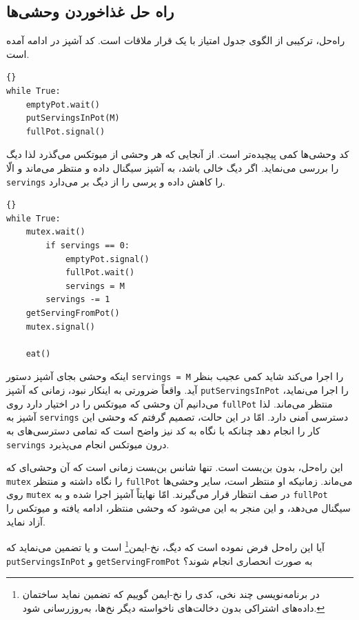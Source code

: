 \documentclass{book}
\newcommand{\clearemptydoublepage}{}%
\begin{document}
\clearemptydoublepage
\subsection{راه‌ حل غذاخوردن وحشی‌ها}

    راه‌حل،  ترکیبی از الگوی جدول امتیاز با یک قرار ملاقات است.  کد آشپز در ادامه آمده است. 

\begin{latin}
\begin{lstlisting}[title=\rl{راه‌‌حل غذاخوردن وحشی‌ها (آشپز)}]{}
while True:
    emptyPot.wait()
    putServingsInPot(M)
    fullPot.signal()
\end{lstlisting}
\end{latin}

    کد وحشی‌ها کمی پیچیده‌تر است. از آنجایی که هر وحشی از میوتکس می‌گذرد لذا دیگ را بررسی می‌نماید. 
    اگر دیگ خالی باشد، به آشپز سیگنال داده و منتظر می‌ماند و الّا  {\tt servings} را کاهش داده و پرسی را از دیگ بر می‌دارد. 

\begin{latin}
\begin{lstlisting}[title=\rl{راه‌‌حل غذاخوردن وحشی‌ها (وحشی)}]{}
while True:
    mutex.wait()
        if servings == 0:
            emptyPot.signal()
            fullPot.wait()
            servings = M
        servings -= 1
	getServingFromPot()
    mutex.signal()

    eat()
\end{lstlisting}
\end{latin}

    اینکه وحشی بجای آشپز دستور {\tt servings = M} را اجرا می‌کند شاید کمی عجیب بنظر آید. 
    واقعاً ضرورتی به اینکار نبود، زمانی که 
    آشپز {\tt putServingsInPot} را اجرا می‌نماید، می‌دانیم آن وحشی که میوتکس را در اختیار دارد 
    روی {\tt fullPot} منتظر می‌ماند. 
    لذا آشپز به  {\tt servings} دسترسی اَمنی دارد.  
    امّا در این حالت،‌ تصمیم گرفتم که وحشی این کار را انجام دهد چنانکه با نگاه به کد نیز 
    واضح است که تمامی دسترسی‌های به  {\tt servings} درون میوتکس انجام می‌پذیرد. 
    

    این راه‌حل، بدون بن‌بست است. 
    تنها شانس بن‌بست زمانی است که آن وحشی‌ای که {\tt mutex}  را نگاه داشته و منتظر {\tt fullPot} می‌ماند. 
    زمانیکه او منتظر است، سایر وحشی‌ها روی {\tt mutex} در صف انتظار قرار می‌گیرند. 
    امّا نهایتاً آشپز اجرا شده و به {\tt fullPot} سیگنال می‌دهد، 
    و این منجر به این می‌شود که  وحشی منتظر، ادامه یافته و میوتکس را آزاد نماید. 
    

    آیا این راه‌حل فرض نموده است که دیگ، نخ-ایمن\footnote{%
    در برنامه‌نویسی چند نخی، کدی را نخ-ایمن گوییم که تضمین نماید ساختمان داده‌های اشتراکی 
    بدون دخالت‌های ناخواسته دیگر نخ‌ها، به‌روزرسانی شود.%
    }  است و یا تضمین می‌نماید که  {\tt putServingsInPot} و {\tt getServingFromPot} 
    به صورت انحصاری انجام شوند؟
\end{document}
